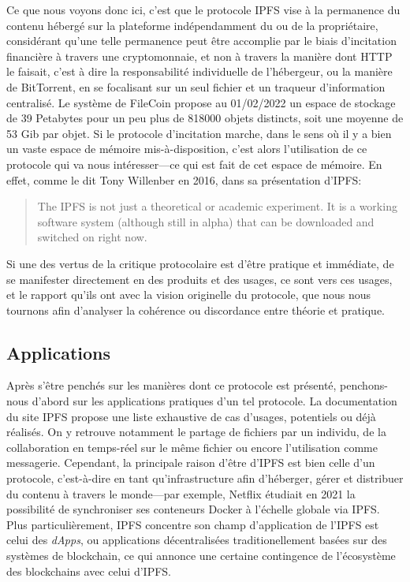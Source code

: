 \documentclass{article}
\begin{document}
Ce que nous voyons donc ici, c'est que le protocole IPFS vise à la permanence du contenu hébergé sur la plateforme indépendamment du ou de la propriétaire, considérant qu'une telle permanence peut être accomplie par le biais d'incitation financière à travers une cryptomonnaie, et non à travers la manière dont HTTP le faisait, c'est à dire la responsabilité individuelle de l'hébergeur, ou la manière de BitTorrent, en se focalisant sur un seul fichier et un traqueur d'information centralisé. Le système de FileCoin propose au 01/02/2022 un espace de stockage de 39 Petabytes pour un peu plus de 818000 objets distincts, soit une moyenne de 53 Gib par objet. Si le protocole d'incitation marche, dans le sens où il y a bien un vaste espace de mémoire mis-à-disposition, c'est alors l'utilisation de ce protocole qui va nous intéresser—ce qui est fait de cet espace de mémoire. En effet, comme le dit Tony Willenber en 2016, dans sa présentation d'IPFS:

\begin{quote}
    The IPFS is not just a theoretical or academic experiment. It is a working software system (although still in alpha) that can be downloaded and switched on right now.\cite{willenberg_ipfs_2018}
\end{quote}

Si une des vertus de la critique protocolaire est d'être pratique et immédiate, de se manifester directement en des produits et des usages, ce sont vers ces usages, et le rapport qu'ils ont avec la vision originelle du protocole, que nous nous tournons afin d'analyser la cohérence ou discordance entre théorie et pratique.

\subsection{Applications}

Après s'être penchés sur les manières dont ce protocole est présenté, penchons-nous d'abord sur les applications pratiques d'un tel protocole. La documentation du site IPFS propose une liste exhaustive de cas d'usages, potentiels ou déjà réalisés. On y retrouve notamment le partage de fichiers par un individu, de la collaboration en temps-réel sur le même fichier ou encore l'utilisation comme messagerie. Cependant, la principale raison d'être d'IPFS est bien celle d'un protocole, c'est-à-dire en tant qu'infrastructure afin d'héberger, gérer et distribuer du contenu à travers le monde—par exemple, Netflix étudiait en 2021 la possibilité de synchroniser ses conteneurs Docker à l'échelle globale via IPFS\cite{noauthor_new_2020}. Plus particulièrement, IPFS concentre son champ d'application de l'IPFS est celui des \emph{dApps}, ou applications décentralisées traditionellement basées sur des systèmes de blockchain, ce qui annonce une certaine contingence de l'écosystème des blockchains avec celui d'IPFS.
\end{document}
